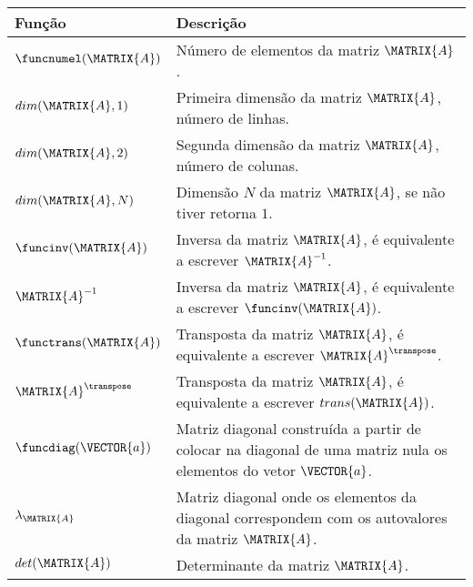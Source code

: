 \begin{notation}~\\
\begin{tabular}{p{} |  p{} }
\hline	
\textbf{Função} & \textbf{Descrição} \\ \hline
$\funcnumel(\MATRIX{A})$ & Número de elementos da matriz $\MATRIX{A}$. \\
\hline
$dim(\MATRIX{A},1)$ & Primeira dimensão da matriz $\MATRIX{A}$, número de linhas. \\
$dim(\MATRIX{A},2)$ & Segunda dimensão da matriz $\MATRIX{A}$, número de colunas. \\
$dim(\MATRIX{A},N)$ & Dimensão $N$ da matriz $\MATRIX{A}$, se não tiver retorna $1$. \\
\hline
$\funcinv(\MATRIX{A})$ & Inversa da matriz $\MATRIX{A}$, é equivalente a escrever $\MATRIX{A}^{-1}$. \\
$\MATRIX{A}^{-1}$ & Inversa da matriz $\MATRIX{A}$, é equivalente a escrever $\funcinv(\MATRIX{A})$. \\
\hline
$\functrans(\MATRIX{A})$ & Transposta da matriz $\MATRIX{A}$, é equivalente a escrever $\MATRIX{A}^{\transpose}$. \\
$\MATRIX{A}^{\transpose}$ & Transposta da matriz $\MATRIX{A}$, é equivalente a escrever $trans(\MATRIX{A})$. \\
\hline
$\funcdiag(\VECTOR{a})$ & Matriz diagonal construída a partir de colocar na diagonal de uma matriz nula os elementos do vetor $\VECTOR{a}$. \\
\hline
$\lambda_{\MATRIX{A}}$ & Matriz diagonal onde os elementos da diagonal correspondem com os autovalores da matriz $\MATRIX{A}$. \\
\hline
$det(\MATRIX{A})$ & Determinante da matriz $\MATRIX{A}$. \\
\hline
\end{tabular}
\end{notation}

